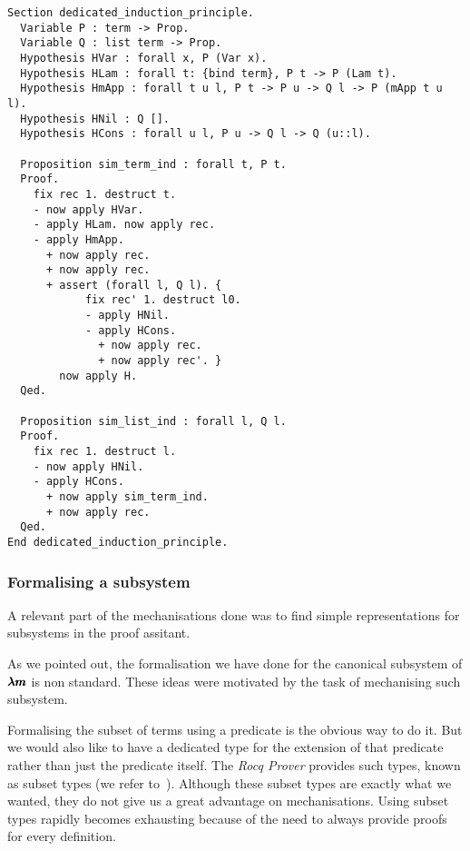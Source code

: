 \begin{lstlisting}[language=Coq]
Section dedicated_induction_principle.
  Variable P : term -> Prop.
  Variable Q : list term -> Prop.
  Hypothesis HVar : forall x, P (Var x).
  Hypothesis HLam : forall t: {bind term}, P t -> P (Lam t).
  Hypothesis HmApp : forall t u l, P t -> P u -> Q l -> P (mApp t u l).
  Hypothesis HNil : Q [].
  Hypothesis HCons : forall u l, P u -> Q l -> Q (u::l).
  
  Proposition sim_term_ind : forall t, P t.
  Proof.
    fix rec 1. destruct t.
    - now apply HVar.
    - apply HLam. now apply rec.
    - apply HmApp.
      + now apply rec.
      + now apply rec.
      + assert (forall l, Q l). {
            fix rec' 1. destruct l0.
            - apply HNil.
            - apply HCons.
              + now apply rec.
              + now apply rec'. }          
        now apply H.
  Qed.      
  
  Proposition sim_list_ind : forall l, Q l.
  Proof.
    fix rec 1. destruct l.
    - now apply HNil.
    - apply HCons.
      + now apply sim_term_ind.
      + now apply rec.
  Qed.          
End dedicated_induction_principle.
\end{lstlisting}

\subsubsection{Formalising a subsystem}


A relevant part of the mechanisations done was to find simple representations for subsystems in the proof assitant.

As we pointed out, the formalisation we have done for the canonical subsystem of $\pmb{\lambda m}$ is non standard.
These ideas were motivated by the task of mechanising such subsystem.

Formalising the subset of terms using a predicate is the obvious way to do it.
But we would also like to have a dedicated type for the extension of that predicate rather than just the predicate itself.
The \textit{Rocq Prover} provides such types, known as subset types (we refer to~\cite[Chapter~9.1]{CoqArt}).
Although these subset types are exactly what we wanted, they do not give us a great advantage on mechanisations.
Using subset types rapidly becomes exhausting because of the need to always provide proofs for every definition.

